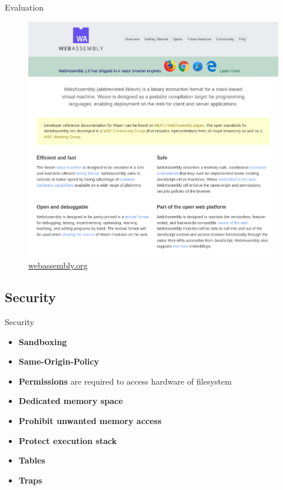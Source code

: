 \documentclass{beamer}
\begin{document}
\begin{frame}{Evaluation}
    \begin{figure}
        \includegraphics[scale=0.2]{./images/webassembly_org.png}
        \caption{\href{https://webassembly.org/}{webassembly.org}}
    \end{figure}
\end{frame}

\subsection{Security}

\begin{frame}{Security}
    \begin{itemize}
    \item \textbf{Sandboxing}
    \item \textbf{Same-Origin-Policy}
    \item \textbf{Permissions} are required to access hardware of filesystem
    \item \textbf{Dedicated memory space}
    \item \textbf{Prohibit unwanted memory access}
    \item \textbf{Protect execution stack}
    \item \textbf{Tables}
    \item \textbf{Traps}
    \end{itemize}
\end{frame}
\end{document}
